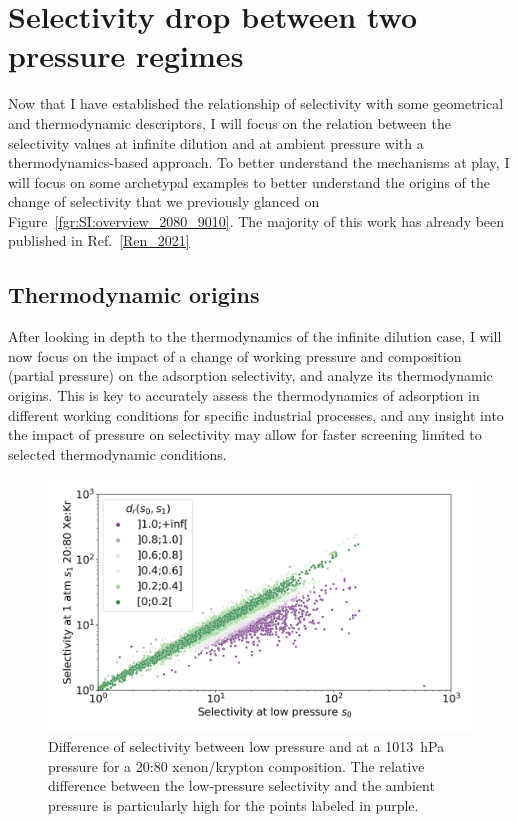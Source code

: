 \documentclass[main.tex]{subfiles}
\begin{document}
\section{Selectivity drop between two pressure regimes}

Now that I have established the relationship of selectivity with some geometrical and thermodynamic descriptors, I will focus on the relation between the selectivity values at infinite dilution and at ambient pressure with a thermodynamics-based approach. To better understand the mechanisms at play, I will focus on some archetypal examples to better understand the origins of the change of selectivity that we previously glanced on Figure~\ref{fgr:SI:overview_2080_9010}. The majority of this work has already been published in Ref.~\ref{Ren_2021}

\subsection{Thermodynamic origins}\label{section:pressure}

After looking in depth to the thermodynamics of the infinite dilution case, I will now focus on the impact of a change of working pressure and composition (partial pressure) on the adsorption selectivity, and analyze its thermodynamic origins. This is key to accurately assess the thermodynamics of adsorption in different working conditions for specific industrial processes, and any insight into the impact of pressure on selectivity may allow for faster screening limited to selected thermodynamic conditions.

\begin{figure}[ht]
  \centering
    \includegraphics[width=0.6\linewidth]{figures/2-thermo/s_0_vs_s_2080_overview_log.jpg}
    \caption{Difference of selectivity between low pressure and at a \SI{1013}{\hecto\pascal} pressure for a 20:80 xenon/krypton composition. The relative difference between the low-pressure selectivity and the ambient pressure is particularly high for the points labeled in purple.}\label{fgr:overview}
\end{figure}
\end{document}
